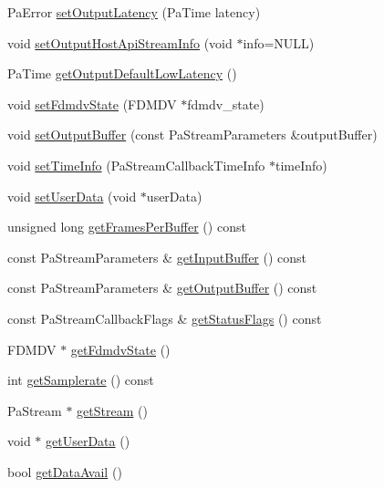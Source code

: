 \begin{DoxyCompactItemize}
\item 
Pa\-Error \hyperlink{class_port_audio_wrap_a619ad8a126e30b328468a57c8047f2f8}{set\-Output\-Latency} (Pa\-Time latency)
\item 
void \hyperlink{class_port_audio_wrap_ab7d9fc6cda5c61cda105e6d9bba9215c}{set\-Output\-Host\-Api\-Stream\-Info} (void $\ast$info=N\-U\-L\-L)
\item 
Pa\-Time \hyperlink{class_port_audio_wrap_a1014d8750069b7dc914e6f836da79660}{get\-Output\-Default\-Low\-Latency} ()
\item 
void \hyperlink{class_port_audio_wrap_a65d6263d05a44f6696a3eb93a669e862}{set\-Fdmdv\-State} (F\-D\-M\-D\-V $\ast$fdmdv\-\_\-state)
\item 
void \hyperlink{class_port_audio_wrap_a2284b3598963428bd5970b69a2ec0370}{set\-Output\-Buffer} (const Pa\-Stream\-Parameters \&output\-Buffer)
\item 
void \hyperlink{class_port_audio_wrap_a4d2bb7132714099aa2a0390f11a57ce6}{set\-Time\-Info} (Pa\-Stream\-Callback\-Time\-Info $\ast$time\-Info)
\item 
void \hyperlink{class_port_audio_wrap_a2bac5a36a40fd1f86df5c1f94e964ac4}{set\-User\-Data} (void $\ast$user\-Data)
\item 
unsigned long \hyperlink{class_port_audio_wrap_ad2ea7c12d674b8bf882a5a5ffdff7acb}{get\-Frames\-Per\-Buffer} () const 
\item 
const Pa\-Stream\-Parameters \& \hyperlink{class_port_audio_wrap_a3e2997d41e53309bfb6b06baabb43a04}{get\-Input\-Buffer} () const 
\item 
const Pa\-Stream\-Parameters \& \hyperlink{class_port_audio_wrap_abb0273b674c970ee96594dd61f7abfc9}{get\-Output\-Buffer} () const 
\item 
const Pa\-Stream\-Callback\-Flags \& \hyperlink{class_port_audio_wrap_a43a6d5f7562fde40166872b77a7804ea}{get\-Status\-Flags} () const 
\item 
F\-D\-M\-D\-V $\ast$ \hyperlink{class_port_audio_wrap_a66693a413ee2158cc331253a1035f915}{get\-Fdmdv\-State} ()
\item 
int \hyperlink{class_port_audio_wrap_a2007046aefb3754994b3fe883b237177}{get\-Samplerate} () const 
\item 
Pa\-Stream $\ast$ \hyperlink{class_port_audio_wrap_a33fed4f960c963aff711932ee84e9a1e}{get\-Stream} ()
\item 
void $\ast$ \hyperlink{class_port_audio_wrap_a07fdd881924d8b7b31b0ed309a8d56cb}{get\-User\-Data} ()
\item 
bool \hyperlink{class_port_audio_wrap_afd5fd9f501e93f712e46b0d805b57493}{get\-Data\-Avail} ()

\end{DoxyCompactItemize}
